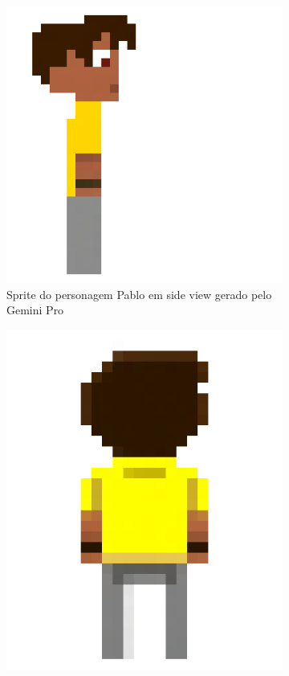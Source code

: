 \begin{figure}[htbp]
    \centering
    \caption{\small Artefatos editados no Pixel Lab}
    \label{fig:pixelLabEdicao}
    \begin{subfigure}{0.45\linewidth}
        \centering
        \includegraphics[width=1\linewidth]{figs/geminiPro/fix grande.png}
        \caption{\small Sprite do personagem Pablo em side view gerado pelo Gemini Pro}
        \label{fig:pixelLabPabloGeminiProSide}
    \end{subfigure}
    \begin{subfigure}{0.45\linewidth}
        \centering
        \includegraphics[width=0.8\linewidth]{figs/geminiPro/back_pixel_grande.png}

\end{subfigure}
\end{figure}
